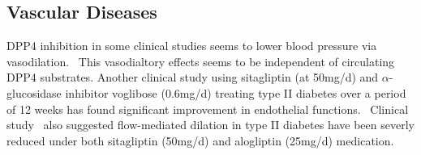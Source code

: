 \subsection{Vascular Diseases}
DPP4 inhibition in some clinical studies seems to lower blood pressure via vasodilation.~\cite{Kröller-Schön2012} This vasodialtory effects seems to be independent of circulating DPP4 substrates. Another clinical study using sitagliptin (at 50mg/d) and $\alpha$-glucosidase inhibitor voglibose (0.6mg/d) treating type II diabetes over a period of 12 weeks has found significant improvement in endothelial functions.~\cite{Nakamura2014} Clinical study~\cite{Ayaori2013} also suggested flow-mediated dilation in type II diabetes have been severly reduced under both sitagliptin (50mg/d) and alogliptin (25mg/d) medication.
\par 
